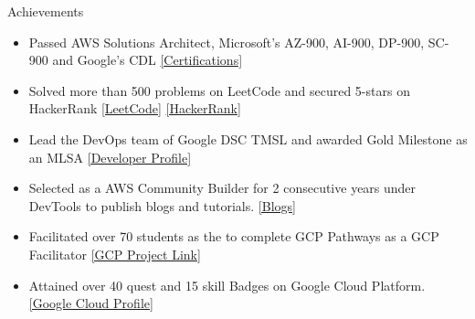 \documentclass{resume} %
\begin{document}
\begin{rSection}{Achievements} 
\begin{itemize}
    \itemsep 1pt {} 
    \item 	Passed AWS Solutions Architect, Microsoft's AZ-900, AI-900, DP-900, SC-900 and Google's CDL \href{https://www.linkedin.com/in/sabyasachi-seal-4461711bb/details/certifications/}{[Certifications]}
    \item	Solved more than 500 problems on LeetCode and secured 5-stars on HackerRank
    \href{https://leetcode.com/sabyasachiseal/}{[LeetCode]}
    \href{https://www.hackerrank.com/yoboy907}{[HackerRank]}
    \item 	Lead the DevOps team of Google DSC TMSL and awarded Gold Milestone as an MLSA \href{https://gdsc.community.dev/techno-main-salt-lake-kolkata/}{[Developer Profile]}
    \item	Selected as a AWS Community Builder for 2 consecutive years under DevTools to publish blogs and tutorials.
    \href{https://medium.com/@yoboy907}{[Blogs]}
    \item	Facilitated over 70 students as the to complete GCP Pathways as a GCP Facilitator
    \href{https://qwiklabsprogresstracker.onrender.com/}{[GCP Project Link]}
    \item	Attained over 40 quest and 15 skill Badges on Google Cloud Platform.
    \href{https://www.cloudskillsboost.google/public_profiles/e3e3af1f-e2c8-48b5-ae19-175dee7b6ef5}{[Google Cloud Profile]}
\end{itemize}


\end{rSection}

\end{document}
